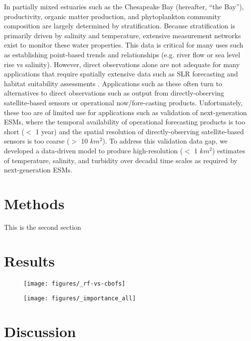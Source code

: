 \documentclass{article}
\begin{document}
In partially mixed estuaries such as the Chesapeake Bay (hereafter, “the Bay”), productivity, organic matter production, and phytoplankton community composition are largely determined by stratification. Because stratification is primarily driven by salinity and temperature, extensive measurement networks exist to monitor these water properties. This data is critical for many uses such as establishing point-based trends and relationships (e.g. river flow or sea level rise vs salinity). However, direct observations alone are not adequate for many applications that require spatially extensive data such as SLR forecasting and habitat suitability assessments \citep{hoodChesapeakeBayProgram2021}. Applications such as these often turn to alternatives to direct observations such as output from directly-observing satellite-based sensors or operational now/fore-casting products. Unfortunately, these too are of limited use for applications such as validation of next-generation ESMs, where the temporal availability of operational forecasting products is too short ($<$ 1 year) and the spatial resolution of directly-observing satellite-based sensors is too coarse ($>$ 10 $km^2$). To address this validation data gap, we developed a data-driven model to produce high-resolution ($<$ 1 $km^2$) estimates of temperature, salinity, and turbidity over decadal time scales as required by next-generation ESMs.

\section{Methods}
This is the second section

\section{Results}

\begin{figure}[ht!]
    \begin{center}
          \texttt{[image: figures/\_rf-vs-cbofs]}
    \end{center}    
\end{figure}

\begin{figure}[ht!]
    \begin{center}
          \texttt{[image: figures/\_importance\_all]}
    \end{center}    
\end{figure}

\section{Discussion}



\end{document}
